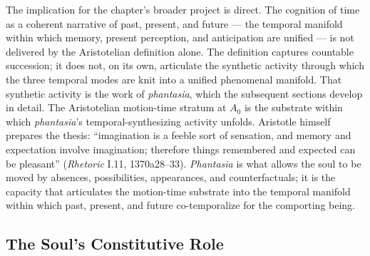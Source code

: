 \documentclass{article}
\begin{document}
The implication for the chapter's broader project is direct. The cognition of time as a coherent narrative of past, present, and future --- the temporal manifold within which memory, present perception, and anticipation are unified --- is not delivered by the Aristotelian definition alone. The definition captures countable succession; it does not, on its own, articulate the synthetic activity through which the three temporal modes are knit into a unified phenomenal manifold. That synthetic activity is the work of \textit{phantasia}, which the subsequent sections develop in detail. The Aristotelian motion-time stratum at $A_0$ is the substrate within which \textit{phantasia}'s temporal-synthesizing activity unfolds. Aristotle himself prepares the thesis: ``imagination is a feeble sort of sensation, and memory and expectation involve imagination; therefore things remembered and expected can be pleasant'' (\textit{Rhetoric} I.11, 1370a28--33). \textit{Phantasia} is what allows the soul to be moved by absences, possibilities, appearances, and counterfactuals; it is the capacity that articulates the motion-time substrate into the temporal manifold within which past, present, and future co-temporalize for the comporting being.

\subsection{The Soul's Constitutive Role}
\end{document}
